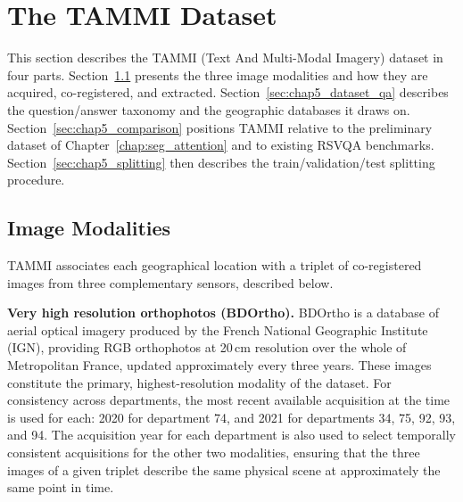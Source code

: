 \section{The TAMMI Dataset}
\label{sec:chap5_dataset}
This section describes the TAMMI (Text And Multi-Modal Imagery) dataset in four parts. 
Section~\ref{sec:chap5_modalities} presents the three image modalities and how they are acquired,
 co-registered, and extracted. Section~\ref{sec:chap5_dataset_qa} describes the question/answer taxonomy and the geographic databases it draws on. 
 Section~\ref{sec:chap5_comparison} positions TAMMI relative to the preliminary dataset of Chapter~\ref{chap:seg_attention} and to existing RSVQA benchmarks. 
 Section~\ref{sec:chap5_splitting} then describes the train/validation/test splitting procedure.
\subsection{Image Modalities}
\label{sec:chap5_modalities}

TAMMI associates each geographical location with a triplet
of co-registered images from three complementary sensors,
described below.

\textbf{Very high resolution orthophotos (BDOrtho).}
BDOrtho is a database of aerial optical imagery produced by
the French National Geographic Institute (IGN), providing
RGB orthophotos at 20\,cm resolution over the whole of
Metropolitan France, updated approximately every three
years. These images
constitute the primary, highest-resolution modality of the
dataset. For consistency across departments, the most
recent available acquisition at the time is used for each: 2020 for
department 74, and 2021 for departments
34, 75, 92, 93, and 94. The acquisition year for each
department is also used to select temporally consistent
acquisitions for the other two modalities, ensuring that the
three images of a given triplet describe the same physical
scene at approximately the same point in time.

